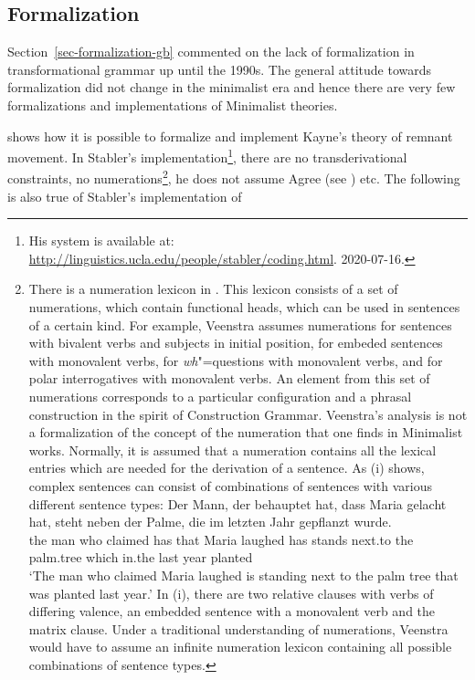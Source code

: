 \subsection{Formalization}
\label{sec-formalization-minimalism}

Section~\ref{sec-formalization-gb} commented on the lack of formalization in transformational
grammar up until the 1990s. The general attitude towards formalization did not change in the
minimalist era and hence there are very few formalizations and implementations of Minimalist theories.

\citet{Stabler2001a} shows how it is possible to formalize and implement Kayne's theory of remnant movement. In
Stabler's implementation\footnote{%
	His system is available at:
\url{http://linguistics.ucla.edu/people/stabler/coding.html}. 2020-07-16.
}, there are no transderivational
constraints, no numerations\footnote{%
	There is a numeration lexicon in \citet[Chapter~9]{Veenstra98a}. This lexicon consists of a set of numerations, which contain functional
	heads, which can be used in sentences of a certain kind. For example, Veenstra assumes numerations for sentences with bivalent verbs
	and subjects in initial position, for embeded sentences with monovalent verbs, for \emph{wh}"=questions with monovalent verbs, and
	for polar interrogatives with monovalent verbs. An element from this set of numerations corresponds to a particular configuration and a
	phrasal construction in the spirit of Construction Grammar\indexcxg. Veenstra's analysis is not a formalization of the concept of the numeration
	that one finds in Minimalist works. Normally, it is assumed that a numeration contains all the lexical entries which are needed for the derivation
	of a sentence. As (i) shows, complex sentences can consist of combinations of sentences with
        various different sentence types: 
\ea
\gll Der Mann, der behauptet hat, dass Maria gelacht hat, steht neben der Palme, die im letzten Jahr gepflanzt wurde.\\
     the man who claimed has that Maria laughed has stands next.to the palm.tree which in.the last year planted \AUX\\
\glt `The man who claimed Maria laughed is standing next to the palm tree that was planted last year.'
\z
In (i), there are two relative clauses with verbs of differing valence, an embedded sentence with a monovalent verb and the matrix clause.
Under a traditional understanding of numerations, Veenstra would have to assume an infinite numeration lexicon containing all possible
combinations of sentence types.
}, he does not assume Agree (see \citealp[]{Fong2014a}) etc. The following is also true of Stabler's implementation of 
